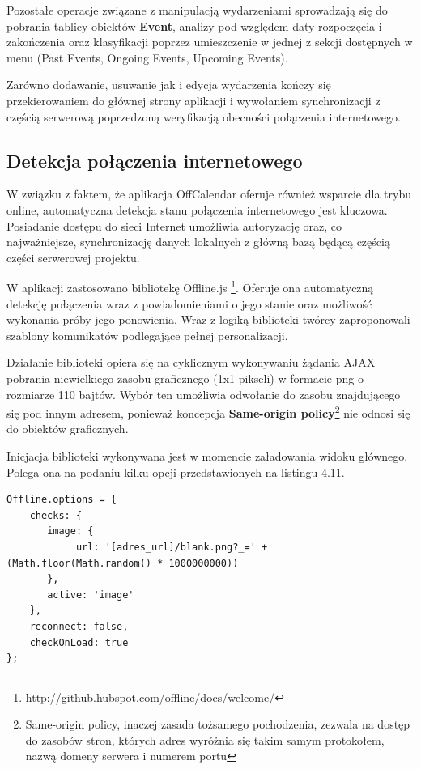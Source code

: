 Pozostałe operacje związane z manipulacją wydarzeniami sprowadzają się do pobrania tablicy obiektów \textbf{Event}, analizy pod względem daty rozpoczęcia i zakończenia oraz klasyfikacji poprzez umieszczenie w jednej z sekcji dostępnych w menu (Past Events, Ongoing Events, Upcoming Events).

Zarówno dodawanie, usuwanie jak i edycja wydarzenia kończy się przekierowaniem do głównej strony aplikacji i wywołaniem synchronizacji z częścią serwerową poprzedzoną weryfikacją obecności połączenia internetowego.

\subsection{Detekcja połączenia internetowego}
\label{sec:detPolInt}

W związku z faktem, że aplikacja OffCalendar oferuje również wsparcie dla trybu online, automatyczna detekcja stanu połączenia internetowego jest kluczowa. Posiadanie dostępu do sieci Internet umożliwia autoryzację oraz, co najważniejsze, synchronizację danych lokalnych z główną bazą będącą częścią części serwerowej projektu.

W aplikacji zastosowano bibliotekę Offline.js \footnote{\url{http://github.hubspot.com/offline/docs/welcome/}}. Oferuje ona automatyczną detekcję połączenia wraz z powiadomieniami o jego stanie oraz możliwość wykonania próby jego ponowienia. Wraz z logiką biblioteki twórcy zaproponowali szablony komunikatów podlegające pełnej personalizacji.

Działanie biblioteki opiera się na cyklicznym wykonywaniu żądania AJAX pobrania niewielkiego zasobu graficznego (1x1 pikseli) w formacie png o rozmiarze 110 bajtów. Wybór ten umożliwia odwołanie do zasobu znajdującego się pod innym adresem, ponieważ koncepcja \textbf{Same-origin policy}\footnote{Same-origin policy, inaczej zasada tożsamego pochodzenia, zezwala na dostęp do zasobów stron, których adres wyróżnia się takim samym protokołem, nazwą domeny serwera i numerem portu\cite{sameOrigin}} nie odnosi się do obiektów graficznych.

Inicjacja biblioteki wykonywana jest w momencie załadowania widoku głównego. Polega ona na podaniu kilku opcji przedstawionych na listingu 4.11.

\begin{lstlisting}[style=js, caption=Inicjalizacja biblioteki Offline.js badającej stan połączenia internetowego., label=amb, captionpos=b]
Offline.options = {
	checks: {
   	   image: {
            url: '[adres_url]/blank.png?_=' + (Math.floor(Math.random() * 1000000000))
       },
       active: 'image'
    },
    reconnect: false,
    checkOnLoad: true
};
\end{lstlisting}

